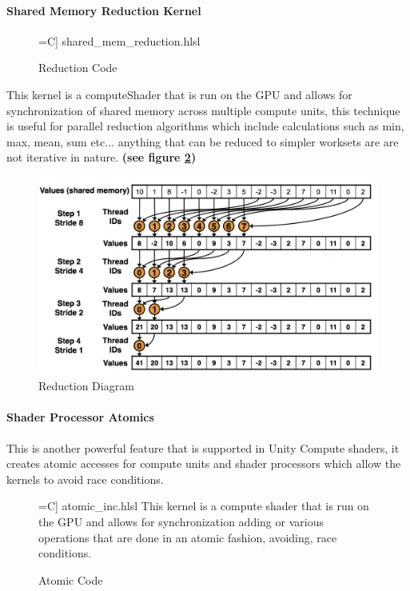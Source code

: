 \documentclass[a4paper,10pt]{article}
\begin{document}
\paragraph{Shared Memory Reduction Kernel}
\begin{figure}[H]
	\label{fig:reductionCode}
 =C] {shared_mem_reduction.hlsl}
\caption{Reduction Code}
\end{figure}

This kernel is a computeShader that is run on the GPU and allows for synchronization of shared memory across multiple compute units, this technique is useful for parallel reduction algorithms which include
calculations such as min, max, mean, sum etc... anything that can be reduced to simpler worksets are are not iterative in nature. \textbf{(see figure \ref{fig:reductionImg})}

\begin{figure}[H]
	\includegraphics[width=\linewidth,height=\paperheight,keepaspectratio]{reduction.jpg}
	\caption{Reduction Diagram}
	\label{fig:reductionImg}
	\end{figure}
\paragraph{Shader Processor Atomics} 
This is another powerful feature that is supported in Unity Compute shaders, it creates atomic accesses for compute units and shader processors which allow the kernels to avoid race conditions. 
\begin{figure}[H]
 =C] {atomic_inc.hlsl}
This kernel is a compute shader that is run on the GPU and allows for synchronization adding or various operations that are done in an atomic fashion, avoiding, race conditions.
\caption{Atomic Code}
\label{fig:atomicCode}
\end{figure}
\end{document}

